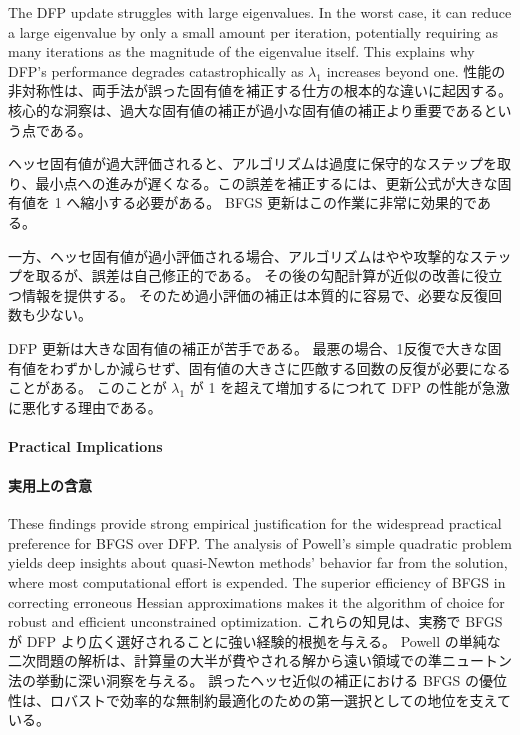 \documentclass[0_main]{subfiles}
\begin{document}
    The DFP update struggles with large eigenvalues.
    In the worst case, it can reduce a large eigenvalue by only a small amount per iteration, potentially requiring as many iterations as the magnitude of the eigenvalue itself.
    This explains why DFP's performance degrades catastrophically as $\lambda_1$ increases beyond one.
\else
    性能の非対称性は、両手法が誤った固有値を補正する仕方の根本的な違いに起因する。
    核心的な洞察は、過大な固有値の補正が過小な固有値の補正より重要であるという点である。

    ヘッセ固有値が過大評価されると、アルゴリズムは過度に保守的なステップを取り、最小点への進みが遅くなる。この誤差を補正するには、更新公式が大きな固有値を 1 へ縮小する必要がある。
    BFGS 更新はこの作業に非常に効果的である。

    一方、ヘッセ固有値が過小評価される場合、アルゴリズムはやや攻撃的なステップを取るが、誤差は自己修正的である。
    その後の勾配計算が近似の改善に役立つ情報を提供する。
    そのため過小評価の補正は本質的に容易で、必要な反復回数も少ない。

    DFP 更新は大きな固有値の補正が苦手である。
    最悪の場合、1反復で大きな固有値をわずかしか減らせず、固有値の大きさに匹敵する回数の反復が必要になることがある。
    このことが $\lambda_1$ が 1 を超えて増加するにつれて DFP の性能が急激に悪化する理由である。
\fi

\ifEn
    \paragraph{Practical Implications}
\else
    \paragraph{実用上の含意}
\fi

\ifEn
    These findings provide strong empirical justification for the widespread practical preference for BFGS over DFP.
    The analysis of Powell's simple quadratic problem yields deep insights about quasi-Newton methods' behavior far from the solution, where most computational effort is expended.
    The superior efficiency of BFGS in correcting erroneous Hessian approximations makes it the algorithm of choice for robust and efficient unconstrained optimization.
\else
    これらの知見は、実務で BFGS が DFP より広く選好されることに強い経験的根拠を与える。
    Powell の単純な二次問題の解析は、計算量の大半が費やされる解から遠い領域での準ニュートン法の挙動に深い洞察を与える。
    誤ったヘッセ近似の補正における BFGS の優位性は、ロバストで効率的な無制約最適化のための第一選択としての地位を支えている。
\fi
\end{document}
